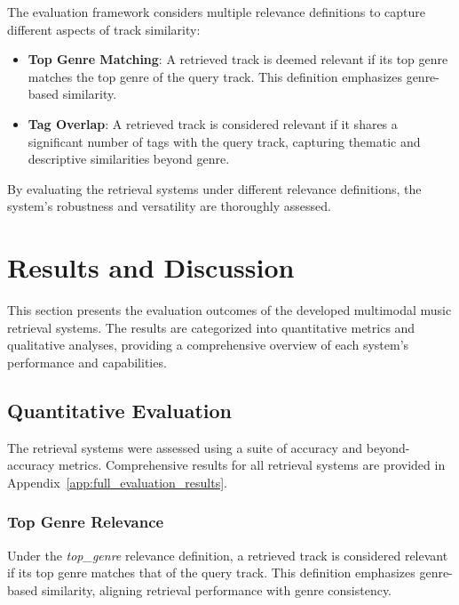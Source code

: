 \documentclass[sigconf]{acmart}
\begin{document}
The evaluation framework considers multiple relevance definitions to capture different aspects of track similarity:

\begin{itemize}
    \item \textbf{Top Genre Matching}: A retrieved track is deemed relevant if its top genre matches the top genre of the query track. This definition emphasizes genre-based similarity.
    
    \item \textbf{Tag Overlap}: A retrieved track is considered relevant if it shares a significant number of tags with the query track, capturing thematic and descriptive similarities beyond genre.
\end{itemize}

By evaluating the retrieval systems under different relevance definitions, the system's robustness and versatility are thoroughly assessed.











\section{Results and Discussion}
\label{sec:results_discussion}

This section presents the evaluation outcomes of the developed multimodal music retrieval systems. The results are categorized into quantitative metrics and qualitative analyses, providing a comprehensive overview of each system's performance and capabilities.

\subsection{Quantitative Evaluation}
\label{subsec:quantitative_evaluation}

The retrieval systems were assessed using a suite of accuracy and beyond-accuracy metrics.  Comprehensive results for all retrieval systems are provided in Appendix~\ref{app:full_evaluation_results}.

\subsubsection{Top Genre Relevance}
\label{subsubsec:top_genre_relevance}

Under the \textit{top\_genre} relevance definition, a retrieved track is considered relevant if its top genre matches that of the query track. This definition emphasizes genre-based similarity, aligning retrieval performance with genre consistency.
\end{document}

